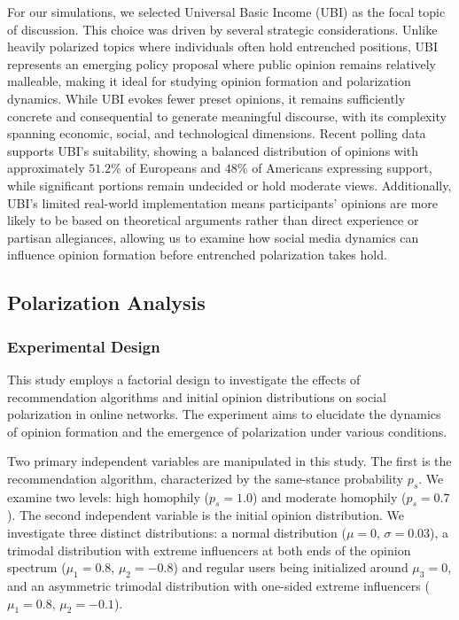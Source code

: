 For our simulations, we selected Universal Basic Income (UBI) as the focal topic of discussion. This choice was driven by several strategic considerations. Unlike heavily polarized topics where individuals often hold entrenched positions, UBI represents an emerging policy proposal where public opinion remains relatively malleable, making it ideal for studying opinion formation and polarization dynamics. While UBI evokes fewer preset opinions, it remains sufficiently concrete and consequential to generate meaningful discourse, with its complexity spanning economic, social, and technological dimensions. Recent polling data supports UBI's suitability, showing a balanced distribution of opinions with approximately $51.2\%$ of Europeans \cite{vlandas_politics_2019} and $48\%$ of Americans \cite{hamilton_people_2022} expressing support, while significant portions remain undecided or hold moderate views. Additionally, UBI's limited real-world implementation means participants' opinions are more likely to be based on theoretical arguments rather than direct experience or partisan allegiances, allowing us to examine how social media dynamics can influence opinion formation before entrenched polarization takes hold.

\subsection{Polarization Analysis}

\subsubsection{Experimental Design}
This study employs a factorial design to investigate the effects of recommendation algorithms and initial opinion distributions on social polarization in online networks. The experiment aims to elucidate the dynamics of opinion formation and the emergence of polarization under various conditions.

Two primary independent variables are manipulated in this study. The first is the recommendation algorithm, characterized by the same-stance probability $p_s$. We examine two levels: high homophily ($p_s = 1.0$) and moderate homophily ($p_s = 0.7$). The second independent variable is the initial opinion distribution. We investigate three distinct distributions: a normal distribution ($\mu = 0$, $\sigma = 0.03$), a trimodal distribution with extreme influencers at both ends of the opinion spectrum ($\mu_1 = 0.8$, $\mu_2 = -0.8$) and regular users being initialized around $\mu_3 = 0$, and an asymmetric trimodal distribution with one-sided extreme influencers ($\mu_1 = 0.8$, $\mu_2 = -0.1$).

